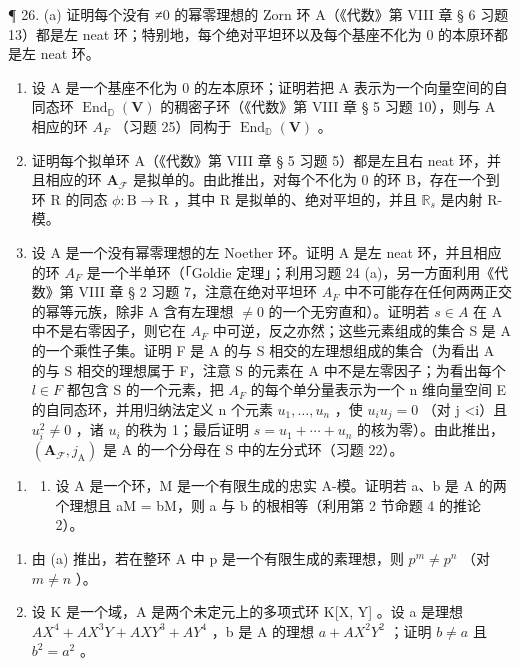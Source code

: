 ¶ 26. (a) 证明每个没有 ≠0 的幂零理想的 Zorn 环 A（《代数》第 VIII 章 § 6 习题 13）都是左 neat 环；特别地，每个绝对平坦环以及每个基座不化为 0 的本原环都是左 neat 环。

\begin{enumerate}
\def\labelenumi{(\alph{enumi})}
\setcounter{enumi}{1}
\item
  设 A 是一个基座不化为 0 的左本原环；证明若把 A 表示为一个向量空间的自同态环 \(\operatorname{End}_{\mathbb{D}}(\mathbf{V})\) 的稠密子环（《代数》第 VIII 章 § 5 习题 10），则与 A 相应的环 \(A_{F}\) （习题 25）同构于 \(\operatorname{End}_{\mathbb{D}}(\mathbf{V})\) 。
\item
  证明每个拟单环 A（《代数》第 VIII 章 § 5 习题 5）都是左且右 neat 环，并且相应的环 \(\mathbf{A}_{\mathcal{F}}\) 是拟单的。由此推出，对每个不化为 0 的环 B，存在一个到环 R 的同态 \(\phi: \mathrm{B} \to \mathrm{R}\) ，其中 R 是拟单的、绝对平坦的，并且 \(\mathbb{R}_s\) 是内射 R-模。
\item
  设 A 是一个没有幂零理想的左 Noether 环。证明 A 是左 neat 环，并且相应的环 \(A_{F}\) 是一个半单环（「Goldie 定理」；利用习题 24 (a)，另一方面利用《代数》第 VIII 章 § 2 习题 7，注意在绝对平坦环 \(A_{F}\) 中不可能存在任何两两正交的幂等元族，除非 A 含有左理想 \(\neq0\) 的一个无穷直和）。证明若 \(s\in A\) 在 A 中不是右零因子，则它在 \(A_{F}\) 中可逆，反之亦然；这些元素组成的集合 S 是 A 的一个乘性子集。证明 F 是 A 的与 S 相交的左理想组成的集合（为看出 A 的与 S 相交的理想属于 F，注意 S 的元素在 A 中不是左零因子；为看出每个 \(l\in F\) 都包含 S 的一个元素，把 \(A_{F}\) 的每个单分量表示为一个 n 维向量空间 E 的自同态环，并用归纳法定义 n 个元素 \(u_{1},\ldots,u_{n}\) ，使 \(u_{i}u_{j}=0\) （对 j \textless i）且 \(u_{i}^{2}\neq0\) ，诸 \(u_{i}\) 的秩为 1；最后证明 \(s=u_{1}+\cdots+u_{n}\) 的核为零）。由此推出，\((\mathbf{A}_{\mathcal{F}},j_{\mathrm{A}})\) 是 A 的一个分母在 S 中的左分式环（习题 22）。
\end{enumerate}

\begin{enumerate}
\def\labelenumi{\arabic{enumi}.}
\setcounter{enumi}{26}
\tightlist
\item
  \begin{enumerate}
  \def\labelenumii{(\alph{enumii})}
  \tightlist
  \item
    设 A 是一个环，M 是一个有限生成的忠实 A-模。证明若 a、b 是 A 的两个理想且 aM = bM，则 a 与 b 的根相等（利用第 2 节命题 4 的推论 2）。
  \end{enumerate}
\end{enumerate}

\begin{enumerate}
\def\labelenumi{(\alph{enumi})}
\setcounter{enumi}{1}
\item
  由 (a) 推出，若在整环 A 中 p 是一个有限生成的素理想，则 \(p^{m} \neq p^{n}\) （对 \(m \neq n\) ）。
\item
  设 K 是一个域，A 是两个未定元上的多项式环 K{[}X, Y{]} 。设 a 是理想 \(AX^{4} + AX^{3}Y + AXY^{3} + AY^{4}\) ，b 是 A 的理想 \(a + AX^{2}Y^{2}\) ；证明 \(b \neq a\) 且 \(b^{2} = a^{2}\) 。
\end{enumerate}
\relax{}
